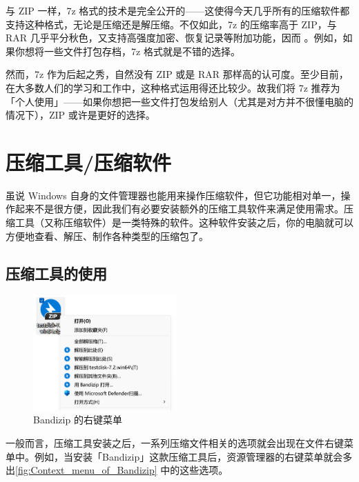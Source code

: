 与 ZIP 一样，7z 格式的技术是完全公开的——这使得今天几乎所有的压缩软件都支持这种格式，无论是压缩还是解压缩。不仅如此，7z 的压缩率高于 ZIP，与 RAR 几乎平分秋色，又支持高强度加密、恢复记录等附加功能，因而 。例如，如果你想将一些文件打包存档，7z 格式就是不错的选择。

然而，7z 作为后起之秀，自然没有 ZIP 或是 RAR 那样高的认可度。至少目前，在大多数人们的学习和工作中，这种格式运用得还比较少。故我们将 7z 推荐为「个人使用」——如果你想把一些文件打包发给别人（尤其是对方并不很懂电脑的情况下），ZIP 或许是更好的选择。

\section{压缩工具/压缩软件}

虽说 Windows 自身的文件管理器也能用来操作压缩软件，但它功能相对单一，操作起来不是很方便，因此我们有必要安装额外的压缩工具软件来满足使用需求。压缩工具（又称压缩软件）是一类特殊的软件。这种软件安装之后，你的电脑就可以方便地查看、解压、制作各种类型的压缩包了。

\subsection{压缩工具的使用}

\begin{figure}
  \centering
  \vspace*{-1.5cm}
  \includegraphics[width=5.5cm]{assets/software/Context_menu_of_Bandizip.png}
  \caption{Bandizip 的右键菜单}
  \label{fig:Context_menu_of_Bandizip}
\end{figure}

一般而言，压缩工具安装之后，一系列压缩文件相关的选项就会出现在文件右键菜单中。例如，当安装「Bandizip」这款压缩工具后，资源管理器的右键菜单就会多出\autoref{fig:Context_menu_of_Bandizip} 中的这些选项。

